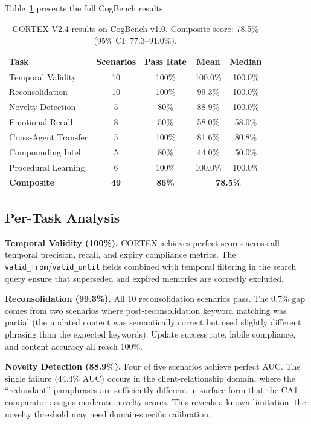 \documentclass{article}
\begin{document}
Table~\ref{tab:results} presents the full CogBench results.

\begin{table}[t]
\centering
\caption{CORTEX V2.4 results on CogBench v1.0. Composite score: 78.5\% (95\% CI: 77.3--91.0\%).}
\label{tab:results}
\small
\begin{tabular}{lcccc}
\toprule
\textbf{Task} & \textbf{Scenarios} & \textbf{Pass Rate} & \textbf{Mean} & \textbf{Median} \\
\midrule
Temporal Validity & 10 & 100\% & 100.0\% & 100.0\% \\
Reconsolidation & 10 & 100\% & 99.3\% & 100.0\% \\
Novelty Detection & 5 & 80\% & 88.9\% & 100.0\% \\
Emotional Recall & 8 & 50\% & 58.0\% & 58.0\% \\
Cross-Agent Transfer & 5 & 100\% & 81.6\% & 80.8\% \\
Compounding Intel. & 5 & 80\% & 44.0\% & 50.0\% \\
Procedural Learning & 6 & 100\% & 100.0\% & 100.0\% \\
\midrule
\textbf{Composite} & \textbf{49} & \textbf{86\%} & \multicolumn{2}{c}{\textbf{78.5\%}} \\
\bottomrule
\end{tabular}
\end{table}

\subsection{Per-Task Analysis}

\textbf{Temporal Validity (100\%).} CORTEX achieves perfect scores across all temporal precision, recall, and expiry compliance metrics. The \texttt{valid\_from}/\texttt{valid\_until} fields combined with temporal filtering in the search query ensure that superseded and expired memories are correctly excluded.

\textbf{Reconsolidation (99.3\%).} All 10 reconsolidation scenarios pass. The 0.7\% gap comes from two scenarios where post-reconsolidation keyword matching was partial (the updated content was semantically correct but used slightly different phrasing than the expected keywords). Update success rate, labile compliance, and content accuracy all reach 100\%.

\textbf{Novelty Detection (88.9\%).} Four of five scenarios achieve perfect AUC. The single failure (44.4\% AUC) occurs in the client-relationship domain, where the ``redundant'' paraphrases are sufficiently different in surface form that the CA1 comparator assigns moderate novelty scores. This reveals a known limitation: the novelty threshold may need domain-specific calibration.
\end{document}
